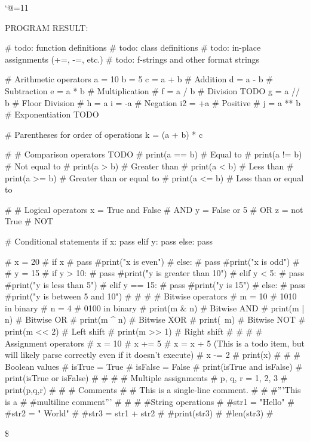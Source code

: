 \let\e\expandafter
\catcode`@=11

\def\@pytexError#1{%
	\errmessage{#1}%
}









\def\@pytexChar@Backslash{\loggingall\@pytexParser@parse}
\let\@pytexChar@Dollar\bye

\def\@pytexChar@DoubleQuote{\relax}
\def\@pytexChar@SingleQuote{\relax}


%

PROGRAM RESULT:

\@pytexCatcodes@setallactive

# todo: function definitions
# todo: class definitions
# todo: in-place assignments (+=, -=, etc.)
# todo: f-strings and other format strings


# Arithmetic operators
a = 10
b = 5
c = a + b  # Addition
d = a - b  # Subtraction
e = a * b  # Multiplication
# f = a / b  # Division TODO
g = a // b # Floor Division
# h = a %
i = -a     # Negation
i2 = +a    # Positive
# j = a ** b # Exponentiation TODO


# Parentheses for order of operations
k = (a + b) * c

# # Comparison operators TODO
# print(a == b)  # Equal to
# print(a != b)  # Not equal to
# print(a > b)   # Greater than
# print(a < b)   # Less than
# print(a >= b)  # Greater than or equal to
# print(a <= b)  # Less than or equal to


# # Logical operators
x = True and False  # AND
y = False or 5   # OR
z = not True        # NOT


# Conditional statements
if x:
    pass
elif y:
    pass
else:
    pass


# x = 20
# if x %
#     pass #print("x is even")
# else:
#     pass #print("x is odd")
# 
# y = 15
# if y > 10:
#     pass #print("y is greater than 10")
# elif y < 5:
# 	pass #print("y is less than 5")
# elif y == 15:
#     pass #print("y is 15")
# else:
#     pass #print("y is between 5 and 10")
# 
# 
# # Bitwise operators
# m = 10  # 1010 in binary
# n = 4   # 0100 in binary
# print(m & n)  # Bitwise AND
# print(m | n)  # Bitwise OR
# print(m ^ n)  # Bitwise XOR
# print(~m)   # Bitwise NOT
# print(m << 2) # Left shift
# print(m >> 1) # Right shift
# 
# 
# # Assignment operators
# x = 10
# x += 5  # x = x + 5  (This is a todo item, but will likely parse correctly even if it doesn't execute)
# x -= 2
# print(x)
# 
# # Boolean values
# isTrue = True
# isFalse = False
# print(isTrue and isFalse)
# print(isTrue or isFalse)
# 
# 
# # Multiple assignments
# p, q, r = 1, 2, 3
# print(p,q,r)
# 
# # Comments
# # This is a single-line comment.
# 
# #'''This is a 
# #multiline comment'''
# 
# 
# #String operations
# #str1 = "Hello"
# #str2 = " World"
# #str3 = str1 + str2
# #print(str3)
# #len(str3)
# 

\$
\bye
